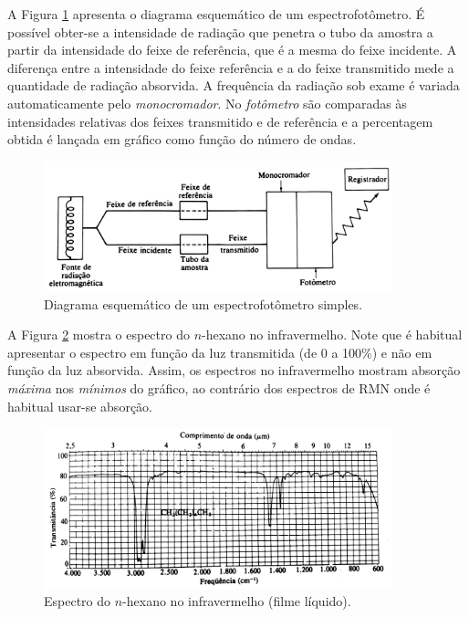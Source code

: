 A Figura \ref{figura_9_1} apresenta o diagrama esquemático de um espectrofotômetro. É possível obter-se a intensidade de radiação que penetra o tubo da amostra a partir da intensidade do feixe de referência, que é a mesma do feixe incidente. A diferença entre a intensidade do feixe referência e a do feixe transmitido mede a quantidade de radiação absorvida. A frequência da radiação sob exame é variada automaticamente pelo \textit{monocromador}. No \textit{fotômetro} são comparadas às intensidades relativas dos feixes transmitido e de referência e a percentagem obtida é lançada em gráfico como função do número de ondas. 

\begin{figure}[H]
    \centering
    \includegraphics[width=0.9\textwidth,angle=0]{content/images/Figura_9_1.pdf}
    \caption{Diagrama esquemático de um espectrofotômetro simples.}
    \label{figura_9_1}
\end{figure}

A Figura \ref{figura_9_2} mostra o espectro do $n$-hexano no infravermelho. Note que é habitual apresentar o espectro em função da luz transmitida (de 0 a 100\%) e não em função da luz absorvida. Assim, os espectros no infravermelho mostram absorção \textit{máxima} nos \textit{mínimos} do gráfico, ao contrário dos espectros de RMN onde é habitual usar-se absorção.

\begin{figure}[H]
    \centering
    \includegraphics[width=0.9\textwidth,angle=0]{content/images/Figura_9_2.pdf}
    \caption{Espectro do $n$-hexano no infravermelho (filme líquido).}
    \label{figura_9_2}
\end{figure}

